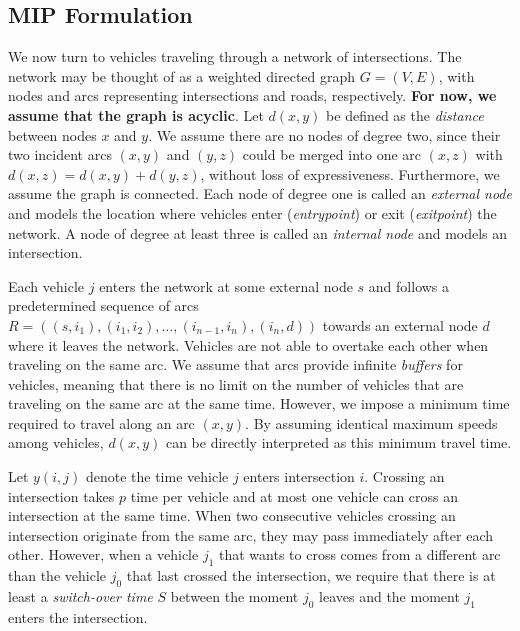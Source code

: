 \documentclass{article}
\theoremstyle{definition}
\theoremstyle{plain}
\begin{document}
\subsection{MIP Formulation}
We now turn to vehicles traveling through a network of intersections. The
network may be thought of as a weighted directed graph $G=(V,E)$, with nodes and
arcs representing intersections and roads, respectively. \textbf{For now, we
  assume that the graph is acyclic}. Let $d(x,y)$ be defined as the
\textit{distance} between nodes $x$ and $y$. We assume there are no nodes of
degree two, since their two incident arcs $(x,y)$ and $(y,z)$ could be merged
into one arc $(x,z)$ with $d(x,z) = d(x,y) + d(y,z)$, without loss of
expressiveness. Furthermore, we assume the graph is connected. Each node of
degree one is called an \textit{external node} and models the location where
vehicles enter (\textit{entrypoint}) or exit (\textit{exitpoint}) the network. A
node of degree at least three is called an \textit{internal node} and models an
intersection.

Each vehicle $j$ enters the network at some external node $s$ and follows a
predetermined sequence of arcs
$R = ((s,i_{1}), (i_{1},i_{2}), \dots, (i_{n-1},i_{n}), (i_{n},d))$ towards an
external node $d$ where it leaves the network. Vehicles are not able to overtake
each other when traveling on the same arc. We assume that arcs provide
infinite \textit{buffers} for vehicles, meaning that there is no limit on the
number of vehicles that are traveling on the same arc at the same time.
However, we impose a minimum time required to travel along an arc $(x,y)$. By
assuming identical maximum speeds among vehicles, $d(x,y)$ can be directly
interpreted as this minimum travel time.

Let $y(i,j)$ denote the time vehicle $j$ enters intersection $i$. Crossing an
intersection takes $p$ time per vehicle and at most one vehicle can cross an
intersection at the same time. When two consecutive vehicles crossing an
intersection originate from the same arc, they may pass immediately after each
other. However, when a vehicle $j_{1}$ that wants to cross comes from a
different arc than the vehicle $j_{0}$ that last crossed the intersection, we
require that there is at least a \textit{switch-over time} $S$ between the
moment $j_{0}$ leaves and the moment $j_{1}$ enters the intersection.
\end{document}
